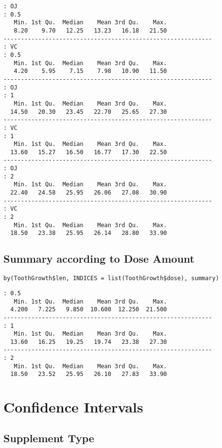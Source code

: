 \documentclass[11pt]{article} %
\begin{document}
\begin{lstlisting}
: OJ
: 0.5
   Min. 1st Qu.  Median    Mean 3rd Qu.    Max. 
   8.20    9.70   12.25   13.23   16.18   21.50 
------------------------------------------------------------ 
: VC
: 0.5
   Min. 1st Qu.  Median    Mean 3rd Qu.    Max. 
   4.20    5.95    7.15    7.98   10.90   11.50 
------------------------------------------------------------ 
: OJ
: 1
   Min. 1st Qu.  Median    Mean 3rd Qu.    Max. 
  14.50   20.30   23.45   22.70   25.65   27.30 
------------------------------------------------------------ 
: VC
: 1
   Min. 1st Qu.  Median    Mean 3rd Qu.    Max. 
  13.60   15.27   16.50   16.77   17.30   22.50 
------------------------------------------------------------ 
: OJ
: 2
   Min. 1st Qu.  Median    Mean 3rd Qu.    Max. 
  22.40   24.58   25.95   26.06   27.08   30.90 
------------------------------------------------------------ 
: VC
: 2
   Min. 1st Qu.  Median    Mean 3rd Qu.    Max. 
  18.50   23.38   25.95   26.14   28.80   33.90 
\end{lstlisting}

\subsection{Summary according to Dose Amount}

\begin{lstlisting}
by(ToothGrowth$len, INDICES = list(ToothGrowth$dose), summary)
\end{lstlisting}

\begin{lstlisting}
: 0.5
   Min. 1st Qu.  Median    Mean 3rd Qu.    Max. 
  4.200   7.225   9.850  10.600  12.250  21.500 
------------------------------------------------------------ 
: 1
   Min. 1st Qu.  Median    Mean 3rd Qu.    Max. 
  13.60   16.25   19.25   19.74   23.38   27.30 
------------------------------------------------------------ 
: 2
   Min. 1st Qu.  Median    Mean 3rd Qu.    Max. 
  18.50   23.52   25.95   26.10   27.83   33.90 
\end{lstlisting}


\section{Confidence Intervals}

\subsection{Supplement Type}
\end{document}
